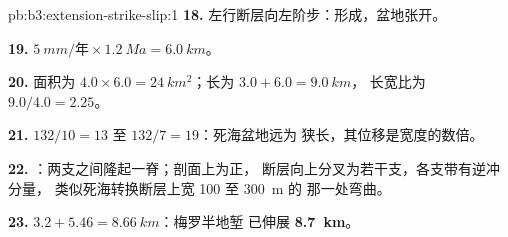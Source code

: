 \begin{solution}{pb:b3:extension-strike-slip:1}
\textbf{18.} 左行断层向左阶步：形成，盆地张开。

\textbf{19.} $\qty{5}{mm/\text{年}}\times\qty{1.2}{Ma} = \qty{6.0}{km}$。

\textbf{20.} 面积为 $4.0\times6.0 = \qty{24}{km^2}$；长为 $3.0 + 6.0 = \qty{9.0}{km}$，
长宽比为 $9.0/4.0 = 2.25$。

\textbf{21.} $132/10 = 13$ 至 $132/7 = 19$：死海盆地远为
狭长，其位移是宽度的数倍。

\textbf{22.} ：两支之间隆起一脊；剖面上为正，
断层向上分叉为若干支，各支带有逆冲分量，
类似死海转换断层上宽 100 至 \qty{300}{m} 的
那一处弯曲。

\textbf{23.} $3.2 + 5.46 = \qty{8.66}{km}$：梅罗半地堑
已伸展 \textbf{\qty[text-series-to-math=true]{8.7}{km}}。
\end{solution}
